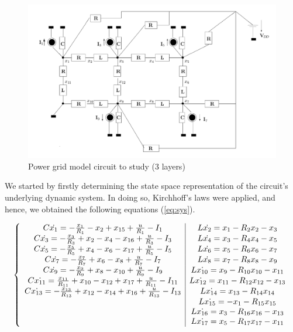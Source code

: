 \documentclass[10pt,a4paper]{article}
\begin{document}
\begin{figure}[!ht]
\centering
\includegraphics[scale=0.35]{./figs/pwr_grid} %
\caption{Power grid model circuit to study (3 layers)}\label{fig:circ}
\end{figure}

We started by firstly determining the state space representation of the circuit's underlying dynamic system. In doing so, Kirchhoff's laws were applied, and hence, we obtained  the following equations (\ref{eq:sys}).

\begin{eqnarray}\label{eq:sys}
\left\lbrace\begin{array}{c | c}
C\dot{x_1} = -\frac{x_1}{R_1} - x_2 + x_{15} + \frac{u}{R_1} - I_1 & L\dot{x_2} = x_1 - R_2x_2 -x_3\\
C\dot{x_3} = -\frac{x_3}{R_3} + x_2 -x_4 - x_{16} + \frac{u}{R_3} - I_3 & L\dot{x_4} = x_3 - R_4x_4 -x_5\\
C\dot{x_5} = -\frac{x_5}{R_5} + x_4 - x_6 - x_{17} + \frac{u}{R_5} - I_5 & L\dot{x_6} = x_5 - R_6x_6 -x_7\\
C\dot{x_7} = -\frac{x_7}{R_7} +x_6 - x_8 + \frac{u}{R_7} - I_7 & L\dot{x_8} = x_7 - R_8x_8 -x_9\\
C\dot{x_9} = -\frac{x_9}{R_9} + x_8 -x_{10}+ \frac{u}{R_9} - I_9 & L\dot{x_{10}} = x_9 - R_{10}x_{10} -x_{11}\\
C\dot{x_{11}} = \frac{x_{11}}{R_{11}} + x_{10} - x_{12} + x_{17} + \frac{u}{R_{11}} - I_{11} & L\dot{x_{12}} = x_{11} - R_{12}x_{12} -x_{13}\\
C\dot{x_{13}} = -\frac{x_{13}}{R_{13}} + x_{12} - x_{14} + x_{16} + \frac{u}{R_{13}} - I_{13} & L\dot{x_{14}} = x_{13} - R_{14}x_{14}\\
& L\dot{x_{15}} = -x_1 - R_{15}x_{15} \\
&L\dot{x_{16}} = x_3 - R_{16}x_{16} -x_{13}\\
&L\dot{x_{17}} = x_5 - R_{17}x_{17} -x_{11}\\
\end{array}\right.
\end{eqnarray}
\end{document}
